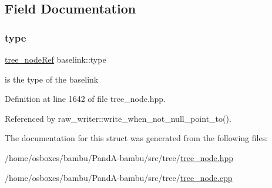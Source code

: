 \subsection{Field Documentation}
\mbox{\label{structbaselink_afbff8cb80e2e644f8a5fdaf4bcb8c46e}} 
\subsubsection{\texorpdfstring{type}{type}}
{\footnotesize\ttfamily \hyperlink{tree__node_8hpp_a6ee377554d1c4871ad66a337eaa67fd5}{tree\+\_\+node\+Ref} baselink\+::type}



is the type of the baselink 



Definition at line 1642 of file tree\+\_\+node.\+hpp.



Referenced by raw\+\_\+writer\+::write\+\_\+when\+\_\+not\+\_\+null\+\_\+point\+\_\+to().



The documentation for this struct was generated from the following files\+:\begin{DoxyCompactItemize}
\item 
/home/osboxes/bambu/\+Pand\+A-\/bambu/src/tree/\hyperlink{tree__node_8hpp}{tree\+\_\+node.\+hpp}\item 
/home/osboxes/bambu/\+Pand\+A-\/bambu/src/tree/\hyperlink{tree__node_8cpp}{tree\+\_\+node.\+cpp}\end{DoxyCompactItemize}
